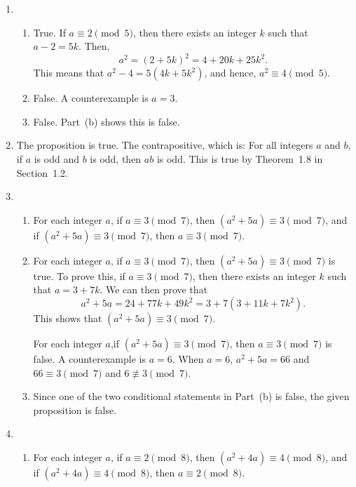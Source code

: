 \begin{enumerate}
\item \begin{enumerate}
\item True.  If $a \equiv 2 \pmod 5$, then there exists an integer $k$ such that $a - 2 = 5k$.  
Then, 
\[
a^2 = \left( 2 + 5k \right)^2 = 4 + 20k + 25k^2.  
\]
This means that $a^2 - 4 = 5 \left( 4k + 5k^2 \right)$, and hence, $a^2 \equiv 4 \pmod 5$.

\item False.  A counterexample is $a = 3$.

\item False.  Part~(b) shows this is false.
\end{enumerate}


\item The proposition is true.  The contrapositive, which is:  For all integers $a$ and $b$, if $a$ is odd and $b$ is odd, then $ab$ is odd.  This is true by Theorem~1.8 in Section~1.2.


\item \begin{enumerate}
\item For each integer $a$, if $a \equiv 3 \pmod 7$, then $(a^2 + 5a) \equiv 3 \pmod 7$, and if $(a^2 + 5a) \equiv 3 \pmod 7$, then $a \equiv 3 \pmod 7$.

\item For each integer $a$, if $a \equiv 3 \pmod 7$, then $(a^2 + 5a) \equiv 3 \pmod 7$ is true.  To prove this, if $a \equiv 3 \pmod 7$, then there exists an integer $k$ such that 
$a = 3 + 7k$.  We can then prove that
\[
a^2 + 5a = 24 + 77k + 49k^2 = 3 + 7(3 + 11k + 7k^2).
\]
This shows that $(a^2 + 5a) \equiv 3 \pmod 7$.

For each integer $a$,if $(a^2 + 5a) \equiv 3 \pmod 7$, then $a \equiv 3 \pmod 7$ is false.  A counterexample is $a = 6$.  When $a = 6$, $a^2 + 5a = 66$ and 
$66 \equiv 3 \pmod 7$ and $6 \not \equiv 3 \pmod 7$.

\item Since one of the two conditional statements in Part~(b) is false, the given proposition is false.
\end{enumerate}



\item \begin{enumerate}
\item For each integer $a$, if $a \equiv 2 \pmod 8$, then $(a^2 + 4a) \equiv 4 \pmod 8$, and if $(a^2 + 4a) \equiv 4 \pmod 8$, then $a \equiv 2 \pmod 8$.


\end{enumerate}
\end{enumerate}
